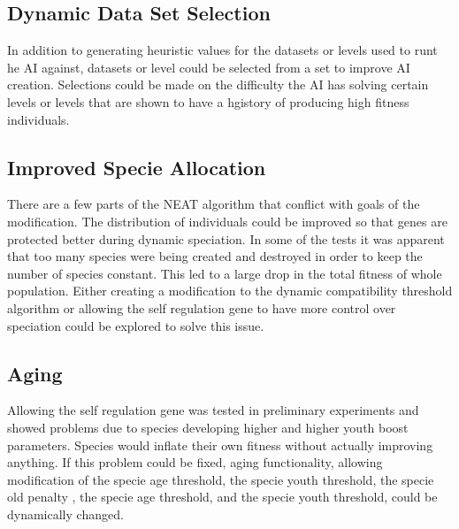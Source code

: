 \documentclass[12pt]{ucthesis} \newif\ifpdf \ifx\pdfoutput\undefined
\begin{document}
\subsection{Dynamic Data Set Selection}

In addition to generating heuristic values for the datasets or levels used to
runt he AI against, datasets or level could be selected from a set to improve AI
creation. Selections could be made on  the difficulty the AI has solving certain
levels or levels that are shown to have a hgistory of producing high fitness
individuals.
\subsection{Improved Specie Allocation}

There are a few parts of the NEAT algorithm that conflict with goals of the
modification. The distribution of individuals could be improved so that genes
are protected better during dynamic speciation. In some of the tests it was
apparent that too many species were being created and destroyed in order to keep
the number of species constant. This led to a large drop in the total fitness of
whole population. Either creating a modification to the dynamic compatibility
threshold algorithm or allowing the self regulation gene to have more control
over speciation could be explored to solve this issue.
\subsection{Aging}

Allowing the self regulation gene was tested in preliminary experiments and
showed problems due to species developing higher and higher youth boost
parameters. Species would inflate their own fitness without actually improving
anything. If this problem could be fixed, aging functionality, allowing
modification of the specie age threshold, the specie youth threshold, the specie
old penalty , the specie age threshold, and the specie youth threshold, could be
dynamically changed.


\clearpage


\end{document}

